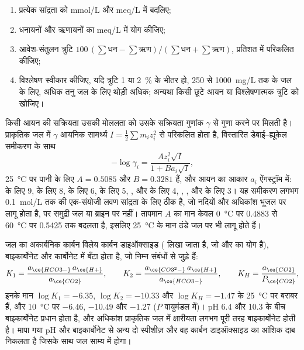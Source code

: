 \begin{method}[जल विश्लेषण की जाँच]\label{met:b3:water-rock-interaction:analysis}
\begin{enumerate}
\item प्रत्येक सांद्रता को \unit{mmol/L} और \unit{meq/L} में बदलिए;
\item धनायनों और ऋणायनों का \unit{meq/L} में योग कीजिए;
\item आवेश-संतुलन त्रुटि $100\,(\sum\text{धन} -
  \sum\text{ऋण})/(\sum\text{धन} + \sum\text{ऋण})$, प्रतिशत में परिकलित कीजिए;
\item विश्लेषण स्वीकार कीजिए, यदि त्रुटि 1 या \qty{2}{\percent} के भीतर हो,
  250 से \qty{1000}{mg/L} तक के जल के लिए, अधिक तनु जल के लिए थोड़ी अधिक;
  अन्यथा किसी छूटे आयन या विश्लेषणात्मक त्रुटि को खोजिए।
\end{enumerate}
\end{method}

किसी आयन की सक्रियता उसकी मोललता को उसके सक्रियता गुणांक
$\gamma$ से गुणा करने पर मिलती है। प्राकृतिक जल में $\gamma$ आयनिक सामर्थ्य $I =
\tfrac12\sum m_i z_i^2$ से परिकलित होता है, विस्तारित डेबाई--ह्यूकेल समीकरण के साथ
\[
-\log\gamma_i = \frac{A z_i^2\sqrt I}{1 + B a_i\sqrt I},
\]
\qty{25}{\celsius} पर पानी के लिए $A = 0.5085$ और $B = 0.3281$ हैं, और आयन का
आकार $a_i$ ऐंगस्ट्रॉम में:  के लिए 9,  के लिए 8,
 के लिए 6,  के लिए 5, ,  और  के लिए 4,
, ,  और  के लिए 3। यह समीकरण
लगभग \qty{0.1}{mol/L} तक की एक-संयोजी लवण सांद्रता के लिए ठीक है, जो नदियों और अधिकांश
भूजल पर लागू होता है, पर समुद्री जल या ब्राइन पर नहीं। तापमान $A$ का मान केवल
\qty{0}{\celsius} पर 0.4883 से \qty{60}{\celsius} पर 0.5425 तक बदलता है, इसलिए
\qty{25}{\celsius} के मान ठंडे जल पर भी लागू होते हैं।

जल का अकार्बनिक कार्बन विलेय कार्बन डाइऑक्साइड
( लिखा जाता है, जो  और  का योग है), बाइकार्बोनेट और
कार्बोनेट में बँटा होता है, जो निम्न संबंधों से जुड़े हैं:
\[
K_1 = \frac{a_{\ce{HCO3-}}\,a_{\ce{H+}}}{a_{\ce{CO2}}}, \qquad
K_2 = \frac{a_{\ce{CO3^2-}}\,a_{\ce{H+}}}{a_{\ce{HCO3-}}}, \qquad
K_H = \frac{a_{\ce{CO2}}}{P_{\ce{CO2}}},
\]
इनके मान $\log K_1 = -6.35$, $\log K_2 = -10.33$ और $\log K_H = -1.47$ के
\qty{25}{\celsius} पर बराबर हैं, और \qty{10}{\celsius} पर $-6.46$, $-10.49$ और $-1.27$
($P$ वायुमंडल में)। pH 6.4 और 10.3 के बीच बाइकार्बोनेट प्रधान होता है, और
अधिकांश प्राकृतिक जल में क्षारीयता लगभग पूरी तरह बाइकार्बोनेट होती है। मापा गया pH
और बाइकार्बोनेट से अन्य दो स्पीशीज़ और वह कार्बन डाइऑक्साइड का आंशिक दाब
निकलता है जिसके साथ जल साम्य में होगा।

